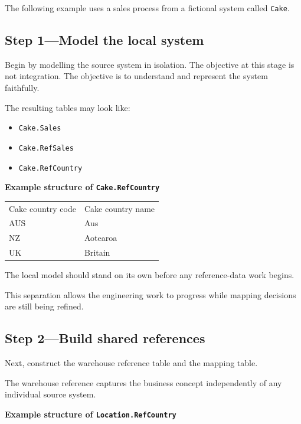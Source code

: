 \documentclass[10pt,openany,10pt]{book}
\providecommand{\tightlist}{%
  \setlength{\itemsep}{0pt}\setlength{\parskip}{0pt}}
\newcounter{none}
\let\podeToprule\toprule
\let\podeMidrule\midrule
\let\podeBottomrule\bottomrule
\renewcommand{\toprule}{\arrayrulecolor{pbiGrid}\podeToprule}
\renewcommand{\midrule}{\arrayrulecolor{pbiGrid}\podeMidrule}
\renewcommand{\bottomrule}{\arrayrulecolor{pbiGrid}\podeBottomrule}
\begin{document}
The following example uses a sales process from a fictional system
called \texttt{Cake}.

\subsection{Step 1---Model the local
system}\label{step-1model-the-local-system}

Begin by modelling the source system in isolation. The objective at this
stage is not integration. The objective is to understand and represent
the system faithfully.

The resulting tables may look like:

\begin{itemize}
\tightlist
\item
  \texttt{Cake.Sales}
\item
  \texttt{Cake.RefSales}
\item
  \texttt{Cake.RefCountry}
\end{itemize}

\textbf{Example structure of \texttt{Cake.RefCountry}}

{\def\LTcaptype{none} %
\begin{longtable}[]{@{}ll@{}}
\toprule\noalign{}
Cake country code & Cake country name \\
\midrule\noalign{}
\endhead
\bottomrule\noalign{}
\endlastfoot
AUS & Aus \\
NZ & Aotearoa \\
UK & Britain \\
\end{longtable}
}

The local model should stand on its own before any reference-data work
begins.

This separation allows the engineering work to progress while mapping
decisions are still being refined.

\subsection{Step 2---Build shared
references}\label{step-2build-shared-references}

Next, construct the warehouse reference table and the mapping table.

The warehouse reference captures the business concept independently of
any individual source system.

\textbf{Example structure of \texttt{Location.RefCountry}}
\end{document}

